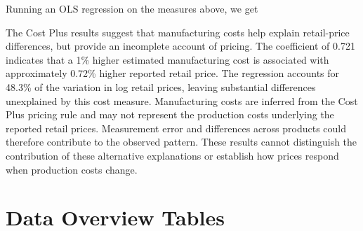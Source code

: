 \documentclass[12pt]{article}
\begin{document}
Running an OLS regression on the measures above, we get



The Cost Plus results suggest that manufacturing costs help explain retail-price differences, but provide an incomplete account of pricing. The coefficient of 0.721 indicates that a 1\% higher estimated manufacturing cost is associated with approximately 0.72\% higher reported retail price. The regression accounts for 48.3\% of the variation in log retail prices, leaving substantial differences unexplained by this cost measure. Manufacturing costs are inferred from the Cost Plus pricing rule and may not represent the production costs underlying the reported retail prices. Measurement error and differences across products could therefore contribute to the observed pattern. These results cannot distinguish the contribution of these alternative explanations or establish how prices respond when production costs change.

\section{Data Overview Tables}
\end{document}
